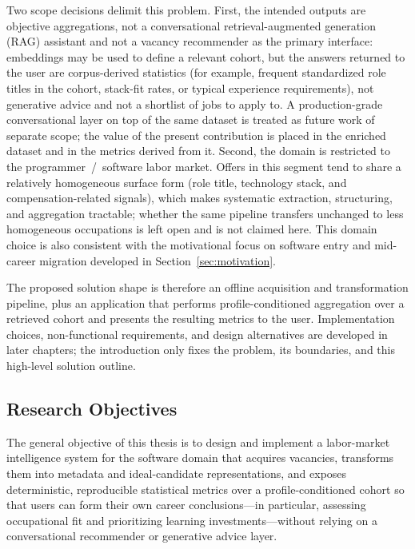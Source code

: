 Two scope decisions delimit this problem.
First, the intended outputs are objective aggregations, not a conversational retrieval-augmented generation (RAG) assistant and not a vacancy recommender as the primary interface: embeddings may be used to define a relevant cohort, but the answers returned to the user are corpus-derived statistics (for example, frequent standardized role titles in the cohort, stack-fit rates, or typical experience requirements), not generative advice and not a shortlist of jobs to apply to.
A production-grade conversational layer on top of the same dataset is treated as future work of separate scope; the value of the present contribution is placed in the enriched dataset and in the metrics derived from it.
Second, the domain is restricted to the programmer~/~software labor market.
Offers in this segment tend to share a relatively homogeneous surface form (role title, technology stack, and compensation-related signals), which makes systematic extraction, structuring, and aggregation tractable; whether the same pipeline transfers unchanged to less homogeneous occupations is left open and is not claimed here.
This domain choice is also consistent with the motivational focus on software entry and mid-career migration developed in Section~\ref{sec:motivation}.

The proposed solution shape is therefore an offline acquisition and transformation pipeline, plus an application that performs profile-conditioned aggregation over a retrieved cohort and presents the resulting metrics to the user.
Implementation choices, non-functional requirements, and design alternatives are developed in later chapters; the introduction only fixes the problem, its boundaries, and this high-level solution outline.

\subsection{Research Objectives}
\label{sec:research-objectives}

The general objective of this thesis is to design and implement a labor-market intelligence system for the software domain that acquires vacancies, transforms them into metadata and ideal-candidate representations, and exposes deterministic, reproducible statistical metrics over a profile-conditioned cohort so that users can form their own career conclusions---in particular, assessing occupational fit and prioritizing learning investments---without relying on a conversational recommender or generative advice layer.

